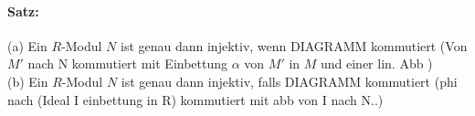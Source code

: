 \documentclass{article}
\begin{document}
	\paragraph{Satz:}(a) Ein $R$-Modul $N$ ist genau dann injektiv, wenn DIAGRAMM kommutiert (Von $M'$ nach N kommutiert mit Einbettung $\alpha$ von $M'$ in $M$ und einer lin. Abb )\\
	(b) Ein $R$-Modul $N$ ist genau dann injektiv, falls DIAGRAMM kommutiert (phi nach (Ideal I einbettung in R) kommutiert mit abb von I nach N..)
\end{document}
